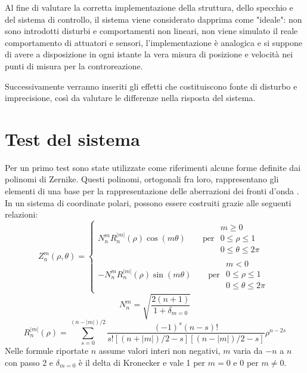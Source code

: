 


\label{chap:simulations}

Al fine di valutare la corretta implementazione della struttura, dello specchio e del sistema di controllo, il sistema viene considerato dapprima come "ideale": non sono introdotti disturbi e comportamenti non lineari, non viene simulato il reale comportamento di attuatori e sensori, l'implementazione è analogica e si suppone di avere a disposizione in ogni istante la vera misura di posizione e velocità nei punti di misura per la controreazione.

Successivamente verranno inseriti gli effetti che costituiscono fonte di disturbo e imprecisione, così da valutare le differenze nella risposta del sistema. 

\section{Test del sistema}
Per un primo test sono  state utilizzate come riferimenti alcune forme definite dai polinomi di Zernike. Questi polinomi, ortogonali fra loro, rappresentano gli elementi di una base per la rappresentazione delle aberrazioni dei fronti d'onda \citep{shannon_applied_1992}.
In un sistema di coordinate polari, possono essere costruiti grazie alle seguenti relazioni:
\begin{equation}
\label{eq:8zernike1}
Z_n^m(\rho,\theta) = 
\left\{
\begin{array}{c}
N_n^mR_n^{|m|}(\rho)\cos(m\theta) \qquad \text{per } \begin{array}{l}m \ge 0\\ 0\le\rho\le
 1\\ 0\le \theta\le 2\pi\end{array}\\
-N_n^mR_n^{|m|}(\rho)\sin(m\theta) \qquad \text{per } \begin{array}{l}m<0\\ 0\le\rho\le1\\ 0\le \theta\le 2\pi\end{array}
\end{array}\right.
\end{equation}
\begin{equation}
\label{eq:8zernike2}
N_n^m = \sqrt{\frac{2(n+1)}{1+\delta_{m=0}}}
\end{equation}
\begin{equation}
\label{eq:8zernike3}
R_n^{|m|}(\rho) = \sum_{s = 0}^{(n-|m|)/2}\frac{(-1)^s(n-s)!}{s!\left[\left(n+|m|\right)/2-s\right]\left[\left(n-|m|\right)/2-s\right]}\rho^{n-2s}
\end{equation}
Nelle formule riportate $n$ assume valori interi non negativi, $m$ varia da $-n$ a $n$ con passo 2 e $\delta_{m=0}$ è il delta di Kronecker e vale 1 per $m=0$ e $0$ per $m\neq 0$.

